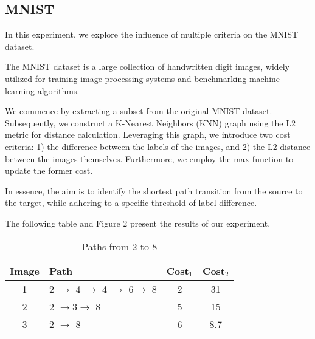 \subsection{MNIST}

In this experiment, we explore the influence of multiple criteria on the MNIST dataset.

The MNIST dataset is a large collection of handwritten digit images, widely utilized for training image processing systems and benchmarking machine learning algorithms.

We commence by extracting a subset from the original MNIST dataset. Subsequently, we construct a K-Nearest Neighbors (KNN) graph using the L2 metric for distance calculation. Leveraging this graph, we introduce two cost criteria: 1) the difference between the labels of the images, and 2) the L2 distance between the images themselves. Furthermore, we employ the max function to update the former cost.

In essence, the aim is to identify the shortest path transition from the source to the target, while adhering to a specific threshold of label difference.

The following table and Figure 2 present the results of our experiment.
\begin{table}[ht]
\centering


\begin{tabular}{|c|l|c|c|}
    \hline
    Image & Path& Cost$_1$& Cost$_2$\\
    \hline
    1 & 2 $\rightarrow$ 4 $\rightarrow$ 4 $\rightarrow$ 6$\rightarrow$ 8 & 2 & 31 \\
    2 & 2 $\rightarrow$3$\rightarrow$ 8 & 5 & 15 \\
    3 & 2 $\rightarrow$ 8 & 6 & 8.7 \\
    \hline
\end{tabular}
\caption{Paths from 2 to 8}
\label{tab:mnist_path}
\end{table}


